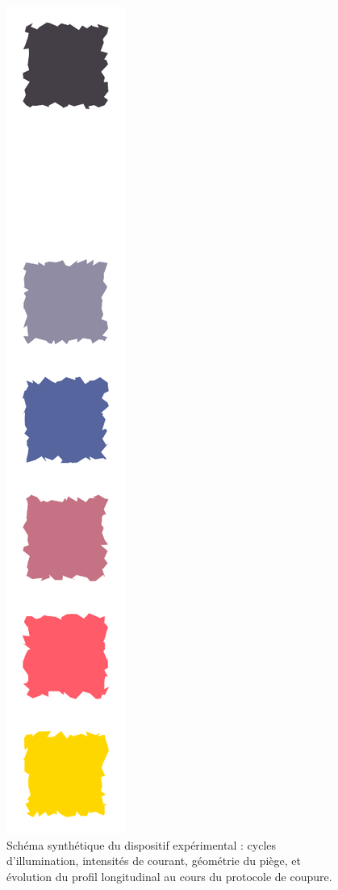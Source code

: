 \begin{figure}[!htb]
\centering
\includegraphics[width=0.5\linewidth , page = 2 ]{BiPart/Figures/Shemas_2.pdf}
\caption{Schéma synthétique du dispositif expérimental : cycles d’illumination, intensités de courant, géométrie du piège, et évolution du profil longitudinal au cours du protocole de coupure.}
\label{fig:setup}
\end{figure}

